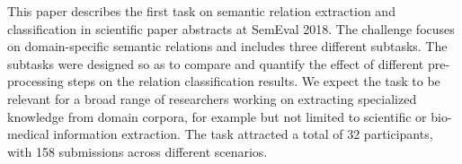 This paper describes the first task on semantic relation extraction and classification in scientific paper abstracts at SemEval 2018. The challenge focuses on domain-specific semantic relations and includes three different subtasks. The subtasks were designed so as to compare and quantify the effect of different pre-processing steps on the relation classification results. We expect the task to be relevant for a broad range of researchers working on extracting specialized knowledge from domain corpora, for example but not limited to scientific or bio-medical information extraction. The task attracted a total of 32 participants, with 158 submissions across different scenarios.
